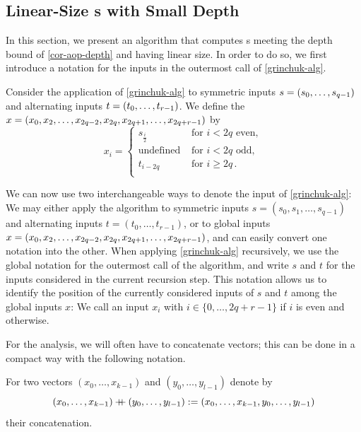 \subsection{Linear-Size \AOP{}s with Small Depth}\label{sec::linear_aops}

In this section, we present an algorithm that computes \aop{}s meeting the depth
bound of \cref{cor-aop-depth} and having linear size.
In order to do so, we first introduce a notation for the inputs
in the outermost call of \cref{grinchuk-alg}.

\begin{definition}
Consider the application of \cref{grinchuk-alg} to
symmetric inputs $s = \left({s_0, \dotsc, s_{q-1}}\right)$
and alternating inputs $t = \left({t_0, \dotsc, t_{r-1}}\right)$.
We define the  $x = ({x_0, x_2, \dotsc, x_{2q - 2}, x_{2q}, x_{2q+1}, \dotsc, x_{2q + r - 1}})$ by
\[x_i = \begin{cases}
         s_{\frac{i}{2}}  & \text{ for } i < 2q \text{ even}, \\
         \text{undefined} & \text{ for } i < 2q \text{ odd},  \\
         t_{i - 2q}            & \text{ for } i \geq 2q\,. \\
        \end{cases}
\]
\end{definition}

We can now use two interchangeable ways to denote the input of \cref{grinchuk-alg}:
We may either apply the algorithm to symmetric inputs $s = (s_0, s_1, \dotsc, s_{q-1})$
and alternating inputs $t = (t_0, \dotsc, t_{r-1})$,
or to global inputs $x = ({x_0, x_2, \dotsc, x_{2q - 2}, x_{2q}, x_{2q+1}, \dotsc, x_{2q + r - 1}})$,
and can easily convert one notation into the other.
When applying \cref{grinchuk-alg} recursively,
we use the global notation for the outermost call of the algorithm,
and write $s$ and $t$ for the inputs considered in the current recursion step.
This notation allows us to identify the position of the currently considered inputs of $s$ and $t$
among the global inputs $x$:
We call an input $x_i$ with $i \in \{0, \dotsc, 2q + r - 1\}$
 if $i$ is even and  otherwise.

For the analysis, we will often have to concatenate vectors; this can be done 
in a compact way with the following notation.

\begin{notation}
For two vectors $(x_0,\dots,x_{k-1})$ and $(y_0,\dots,y_{l-1})$ denote by
\[
   (x_0,\dots,x_{k-1}) \mathbin{+\mkern-8mu+} (y_0,\dots,y_{l-1}) := (x_0,\dots,x_{k-1}, y_0,\dots,y_{l-1})
\]
their concatenation.\label{tupleconcat-notation}
\end{notation}



